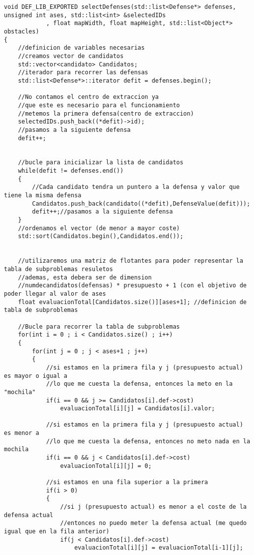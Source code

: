 \begin{lstlisting}[frame=single,basicstyle=\tiny,title={Algoritmo para rellenar la tabla de subproblemas resueltos}]
void DEF_LIB_EXPORTED selectDefenses(std::list<Defense*> defenses, unsigned int ases, std::list<int> &selectedIDs
            , float mapWidth, float mapHeight, std::list<Object*> obstacles)             
{
    //definicion de variables necesarias
    //creamos vector de candidatos
    std::vector<candidato> Candidatos; 
    //iterador para recorrer las defensas
    std::list<Defense*>::iterator defit = defenses.begin(); 
    
    //No contamos el centro de extraccion ya 
    //que este es necesario para el funcionamiento
    //metemos la primera defensa(centro de extraccion)
    selectedIDs.push_back((*defit)->id);
    //pasamos a la siguiente defensa
    defit++;


    //bucle para inicializar la lista de candidatos
    while(defit != defenses.end()) 
    {   
     	//Cada candidato tendra un puntero a la defensa y valor que tiene la misma defensa
        Candidatos.push_back(candidato((*defit),DefenseValue(defit)));
        defit++;//pasamos a la siguiente defensa
    }
    //ordenamos el vector (de menor a mayor coste)
    std::sort(Candidatos.begin(),Candidatos.end());
    

    //utilizaremos una matriz de flotantes para poder representar la tabla de subproblemas resuletos
    //ademas, esta debera ser de dimension 
    //numdecandidatos(defensas) * presupuesto + 1 (con el objetivo de poder llegar al valor de ases
    float evaluacionTotal[Candidatos.size()][ases+1]; //definicion de tabla de subproblemas

	//Bucle para recorrer la tabla de subproblemas
    for(int i = 0 ; i < Candidatos.size() ; i++)
    {
        for(int j = 0 ; j < ases+1 ; j++)
        {
        	//si estamos en la primera fila y j (presupuesto actual) es mayor o igual a 
        	//lo que me cuesta la defensa, entonces la meto en la "mochila"
            if(i == 0 && j >= Candidatos[i].def->cost)	
                evaluacionTotal[i][j] = Candidatos[i].valor;
                
            //si estamos en la primera fila y j (presupuesto actual) es menor a
            //lo que me cuesta la defensa, entonces no meto nada en la mochila
            if(i == 0 && j < Candidatos[i].def->cost)
                evaluacionTotal[i][j] = 0;
                
            //si estamos en una fila superior a la primera
            if(i > 0)
            {
            	//si j (presupuesto actual) es menor a el coste de la defensa actual
            	//entonces no puedo meter la defensa actual (me quedo igual que en la fila anterior)
                if(j < Candidatos[i].def->cost)
                    evaluacionTotal[i][j] = evaluacionTotal[i-1][j];
                    

\end{lstlisting}
